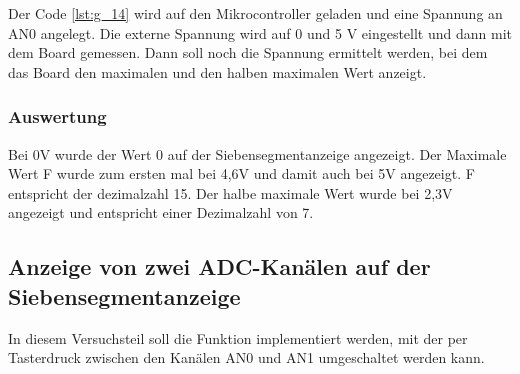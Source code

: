 \documentclass[12pt,a4paper]{article}
\begin{document}
Der Code \ref{lst:g_14} wird auf den Mikrocontroller geladen und eine Spannung an AN0 angelegt. Die externe Spannung wird auf 0 und 5 V eingestellt und dann mit dem Board gemessen. Dann soll noch die Spannung ermittelt werden, bei dem das  Board den maximalen und den halben maximalen Wert anzeigt.

\subsubsection*{Auswertung}

Bei 0V wurde der Wert 0 auf der Siebensegmentanzeige angezeigt. Der Maximale Wert F wurde zum ersten mal bei 4,6V und damit auch bei 5V angezeigt. F entspricht der dezimalzahl 15. Der halbe maximale Wert wurde bei 2,3V angezeigt und entspricht einer Dezimalzahl von 7.

\subsection{Anzeige von zwei ADC-Kanälen auf der Siebensegmentanzeige}

In diesem Versuchsteil soll die Funktion implementiert werden, mit der per Tasterdruck zwischen den Kanälen AN0 und AN1 umgeschaltet werden kann.
\end{document}

